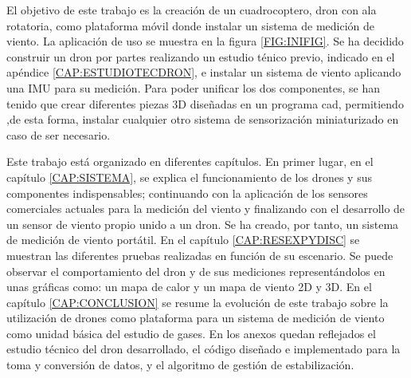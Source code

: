 El objetivo de este trabajo es la creación de un cuadrocoptero, dron con ala rotatoria, como plataforma móvil donde instalar un sistema de medición de viento. La aplicación de uso se muestra en la figura \ref{FIG:INIFIG}. Se ha decidido construir un dron por partes realizando un estudio ténico previo, indicado en el apéndice \ref{CAP:ESTUDIOTECDRON}, e instalar un sistema de viento aplicando una IMU para su medición. Para poder unificar los dos componentes, se han tenido que crear diferentes piezas 3D diseñadas en un programa \ac{cad}, permitiendo ,de esta forma, instalar cualquier otro sistema de sensorización miniaturizado en caso de ser necesario.

Este trabajo está organizado en diferentes capítulos. En primer lugar, en el capítulo \ref{CAP:SISTEMA}, se explica el funcionamiento de los drones y sus componentes indispensables; continuando con la aplicación de los sensores comerciales actuales para la medición del viento y finalizando con el desarrollo de un sensor de viento propio unido a un dron. Se ha creado, por tanto, un sistema de medición de viento portátil. En el capítulo \ref{CAP:RESEXPYDISC} se muestran las diferentes pruebas realizadas en función de su escenario. Se puede observar el comportamiento del dron y de sus mediciones representándolos en unas gráficas como: un mapa de calor y un mapa de viento 2D y 3D. En el capítulo \ref{CAP:CONCLUSION} se resume la evolución de este trabajo sobre la utilización de drones como plataforma para un sistema de medición de viento como unidad básica del estudio de gases. En los anexos quedan reflejados el estudio técnico del dron desarrollado, el código diseñado e implementado para la toma y conversión de datos, y el algoritmo de gestión de estabilización.